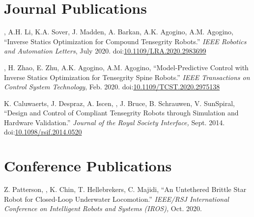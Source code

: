 \documentclass[letterpaper]{deedy-resume} %
\newcommand\doilink[1]{\href{http://dx.doi.org/#1}{#1}}
\newcommand\doi[1]{doi:\doilink{#1}}
\begin{document}
{%

\section{Journal Publications}
\vspace{0.2cm}

\begin{etaremune}[itemsep=0.1cm]

\item \underline{{}}, A.H. Li, K.A. Sover, J. Madden, A. Barkan, A.K. Agogino, A.M. Agogino, ``Inverse Statics Optimization for Compound Tensegrity Robots.'' {\it IEEE Robotics and Automation Letters}, July 2020. \doi{10.1109/LRA.2020.2983699}

\item \underline{{}}, H. Zhao, E. Zhu, A.K. Agogino, A.M. Agogino, ``Model-Predictive Control with Inverse Statics Optimization for Tensegrity Spine Robots.'' {\it IEEE Transactions on Control System Technology}, Feb. 2020. \doi{10.1109/TCST.2020.2975138}

\item K. Caluwaerts, J. Despraz, A. Iscen, \underline{{}}, J. Bruce, B. Schrauwen, V. SunSpiral, ``Design and Control of Compliant Tensegrity Robots through Simulation and Hardware Validation.'' {\it Journal of the Royal Society Interface,} Sept. 2014. \doi{10.1098/rsif.2014.0520}

\end{etaremune}


\section{Conference Publications}
\vspace{0.2cm}

\begin{etaremune}[itemsep=0.1cm]

\item Z. Patterson, \underline{{}}, K. Chin, T. Hellebrekers, C. Majidi, ``An Untethered Brittle Star Robot for Closed-Loop Underwater Locomotion.'' {\it IEEE/RSJ International Conference on Intelligent Robots and Systems (IROS),} Oct. 2020.


\end{etaremune}}
\end{document}
